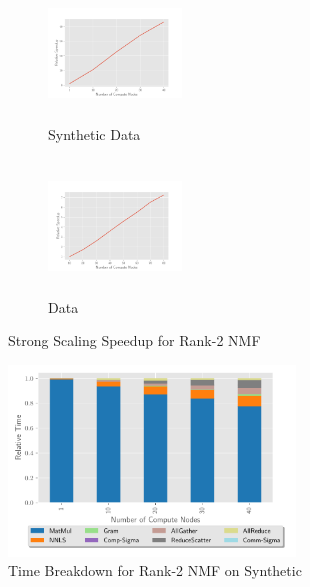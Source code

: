 \begin{figure}
\begin{subfigure}{1.5in}
\begin{center}
\includegraphics[height=1.4in, width=1.4in]{plots/synthetic_rank2_speedup.pdf}
\caption{Synthetic Data}
\label{fig:synrank2speedup}
\end{center}
\end{subfigure}
\begin{subfigure}{1.5in}
\begin{center}
\includegraphics[height=1.4in, width=1.4in]{plots/realworld_rank2_speedup.pdf}
\caption{\image{} Data}
\label{fig:rwrank2speedup}
\end{center}
\end{subfigure}
\caption{Strong Scaling Speedup for Rank-2 NMF}
\label{fig:rank2speedup}
\end{figure}


\begin{figure}
\begin{center}
\includegraphics[height=2in, width=\columnwidth]{plots/synthetic_rank2_strongscaling.pdf}
\caption{Time Breakdown for Rank-2 NMF on Synthetic}
\label{fig:synrank2strongscaling}
\end{center}
\end{figure}

